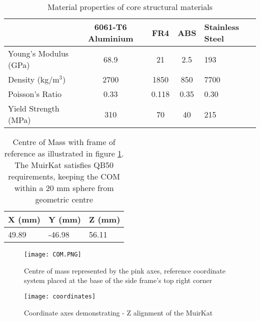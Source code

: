 \begin{table}[H]
\centering
\begin{tabular}{@{}lcccl@{}}
\toprule
                        & \textbf{6061-T6 Aluminium} & \textbf{FR4} & \textbf{ABS} & \textbf{Stainless Steel} \\ \midrule
  Young's Modulus (GPa) & 68.9                       & 21           & 2.5          & 193                      \\
  Density (kg/m$^{3}$)  & 2700                       & 1850         & 850          & 7700                     \\
 Poisson's Ratio       & 0.33                       & 0.118        & 0.35         & 0.30                     \\
 Yield Strength (MPa)  & 310                        & 70           & 40           & 215                      \\ \bottomrule
\end{tabular}
\caption{Material properties of core structural materials}
\label{Materials}
\end{table}
 
\begin{table}[]
\centering
\begin{tabular}{@{}lll@{}}
\toprule
\textbf{X (mm)} & \textbf{Y (mm)} & \textbf{Z (mm)} \\ \midrule
 49.89           & -46.98          & 56.11           \\ \bottomrule
\end{tabular}
\caption{Centre of Mass with frame of reference as illustrated in figure \ref{fig:COM}. The MuirKat satisfies QB50 requirements, keeping the COM within a 20 mm sphere from geometric centre}
\label{COM}
\end{table}
 
\begin{figure}
\centering	
\texttt{[image: COM.PNG]}
\caption{Centre of mass represented by the pink axes, reference coordinate system placed at the base of the side frame's top right corner}
\label{fig:COM}
\end{figure}
  
\begin{figure}
\centering	
\texttt{[image: coordinates]}
\caption{Coordinate axes demonstrating - Z alignment of the MuirKat}
\end{figure}

